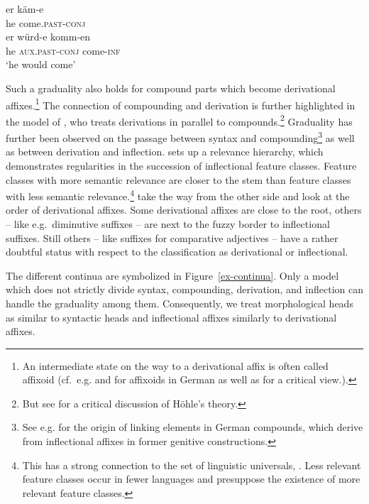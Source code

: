 \documentclass[output=paper
  ,nobabel
  ,draftmode
  ,colorlinks, citecolor=brown
]{langscibook}
\begin{document}
\eal\label{conj}
\ex
\gll er    käm-e \\ he   come.\textsc{past-conj}  \\
\glt 
\ex
\gll er    würd-e   komm-en\\ he   \textsc{aux.past-conj} come-\textsc{inf}  \\
\glt `he would come'
\zl

\noindent Such a graduality also holds for compound parts which become derivational affixes.\footnote{An intermediate state on the way to a derivational affix is often called affixoid (cf.\ e.g. \cite{Elsen2009} and \cite{Szatmari2011} for affixoids in German as well as \cite{Schmidt1987} for a critical view.).} The connection of compounding and derivation is further highlighted in the model of \citet{Hoehle1982}, who treats derivations in parallel to compounds.\footnote{But see \citet{Reis1983} for a critical discussion of Höhle's theory.} Graduality has further been observed on the passage between syntax and compounding\footnote{See e.g. \citet[Section~2]{NueblingSzczepaniak2009} for the origin of linking elements in German compounds, which derive from inflectional affixes in former genitive constructions.} as well as between derivation and inflection. \citet{Bybee1985} sets up a relevance hierarchy, which demonstrates regularities in the succession of inflectional feature classes. Feature classes with more semantic relevance are closer to the stem than feature classes with less semantic relevance.\footnote{This has a strong connection to the set of linguistic universals, \citep[cf.][]{Greenberg1963}. Less relevant feature classes occur in fewer languages and presuppose the existence of more relevant feature classes.} \citet{EisenbergSayatz2002} take the way from the other side and look at the order of derivational affixes. Some derivational affixes are close to the root, others – like e.g.\ diminutive suffixes \citep[cf.][]{Dressler1994} – are next to the fuzzy border to inflectional suffixes. Still others – like suffixes for comparative adjectives – have a rather doubtful status with respect to the classification as derivational or inflectional.

The different continua are symbolized in Figure~\ref{ex-continua}. Only a model which does not strictly divide syntax, compounding, derivation, and inflection can handle the graduality among them. Consequently, we treat morphological heads as similar to syntactic heads and inflectional affixes similarly to derivational affixes.
\end{document}
